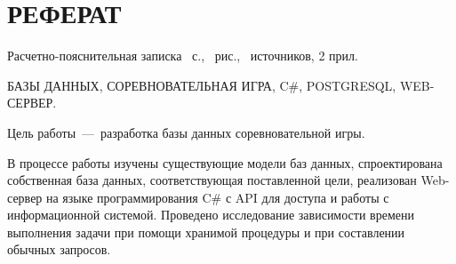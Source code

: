 \chapter*{РЕФЕРАТ}
Расчетно-пояснительная записка \pageref{LastPage}~с., ~рис., ~источников, 2 прил.

БАЗЫ ДАННЫХ, СОРЕВНОВАТЕЛЬНАЯ ИГРА, C\#, POSTGRESQL, WEB-СЕРВЕР.

Цель работы~---~разработка базы данных соревновательной игры.

В процессе работы изучены существующие модели баз данных, спроектирована собственная база данных, соответствующая поставленной цели, реализован Web-сервер на языке программирования C\# с API для доступа и работы с информационной системой. Проведено исследование зависимости времени выполнения задачи при помощи хранимой процедуры и при составлении обычных запросов.
